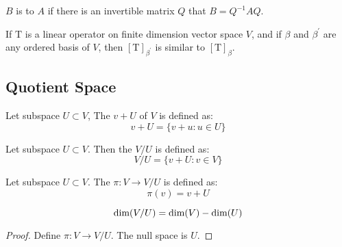 \begin{definition}
	$B$ is  to $A$ if there is an invertible matrix $Q$ that $B = Q^{-1} A Q$.
\end{definition}

\begin{theorem}
If $\mathrm{T}$ is a linear operator on finite dimension vector space $V$, and if $\beta$ and $\beta^\prime$ are any ordered basis of $V$, then $[\mathrm{T}]_{\beta^\prime}$ is similar to $[\mathrm{T}]_\beta$.    
\end{theorem}




\subsection{Quotient Space}

\begin{definition}
    Let subspace $U \subset V$, The   $v + U$ of $V$ is defined as:
    \begin{equation}
        v + U = \{ v + u: u \in U\}
    \end{equation}    
\end{definition}

\begin{definition}
    Let subspace $U \subset V$. Then the  $V/U$ is defined as:
    \begin{equation}
        V/U = \{ v + U: v \in V \}
    \end{equation}
\end{definition}

\begin{definition}
    Let subspace $U \subset V$. The  $\pi: V \rightarrow V/U$ is defined as:
    \begin{equation}
        \pi(v) = v + U
    \end{equation}
\end{definition}

\begin{theorem}
    \begin{equation}
        \displaystyle \text{dim}( V/U ) = \displaystyle \text{dim}( V ) - \displaystyle \text{dim}( U )
    \end{equation}
\end{theorem}

\begin{proof}
    Define $\pi : V \rightarrow V/U$. The null space is $U$.
\end{proof}

